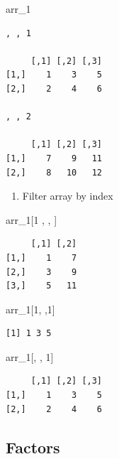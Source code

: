 \documentclass[
  letterpaper,
  DIV=11,
  numbers=noendperiod]{scrreprt}
\newenvironment{Shaded}{\begin{snugshade}}{\end{snugshade}}
\newcommand{\DecValTok}[1]{\textcolor[rgb]{0.68,0.00,0.00}{#1}}
\newcommand{\NormalTok}[1]{\textcolor[rgb]{0.00,0.23,0.31}{#1}}
\providecommand{\tightlist}{%
  \setlength{\itemsep}{0pt}\setlength{\parskip}{0pt}}\usepackage{longtable,booktabs,array}
\begin{document}
\begin{Shaded}
\begin{Highlighting}[]
\NormalTok{arr\_1}
\end{Highlighting}
\end{Shaded}

\begin{verbatim}
, , 1

     [,1] [,2] [,3]
[1,]    1    3    5
[2,]    2    4    6

, , 2

     [,1] [,2] [,3]
[1,]    7    9   11
[2,]    8   10   12
\end{verbatim}

\begin{enumerate}
\def\labelenumi{\alph{enumi}.}
\setcounter{enumi}{1}
\tightlist
\item
  Filter array by index
\end{enumerate}

\begin{Shaded}
\begin{Highlighting}[]
\NormalTok{arr\_1[}\DecValTok{1}\NormalTok{ ,  , ]}
\end{Highlighting}
\end{Shaded}

\begin{verbatim}
     [,1] [,2]
[1,]    1    7
[2,]    3    9
[3,]    5   11
\end{verbatim}

\begin{Shaded}
\begin{Highlighting}[]
\NormalTok{arr\_1[}\DecValTok{1}\NormalTok{, ,}\DecValTok{1}\NormalTok{]}
\end{Highlighting}
\end{Shaded}

\begin{verbatim}
[1] 1 3 5
\end{verbatim}

\begin{Shaded}
\begin{Highlighting}[]
\NormalTok{arr\_1[, , }\DecValTok{1}\NormalTok{]}
\end{Highlighting}
\end{Shaded}

\begin{verbatim}
     [,1] [,2] [,3]
[1,]    1    3    5
[2,]    2    4    6
\end{verbatim}

\subsection{Factors}\label{factors}
\end{document}
